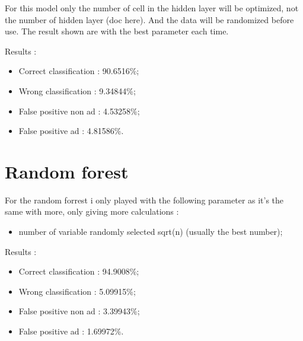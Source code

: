  For this model only the number of cell in the hidden layer will be optimized, not the number of hidden layer (doc here). And the data will be randomized before use. The result shown are with the best parameter each time.

  Results :
  \begin{itemize}
    \item Correct classification : 90.6516\%;
    \item Wrong classification : 9.34844\%;
    \item False positive non ad : 4.53258\%;
    \item False positive ad : 4.81586\%.
  \end{itemize}


\section{Random forest}
For the random forrest i only played with the following parameter as it's the same with more, only giving more calculations :
  \begin{itemize}
    \item number of variable randomly selected sqrt(n) (usually the best number);
  \end{itemize}
Results :
\begin{itemize}
  \item Correct classification : 94.9008\%;
  \item Wrong classification : 5.09915\%;
  \item False positive non ad : 3.39943\%;
  \item False positive ad : 1.69972\%.
\end{itemize}
